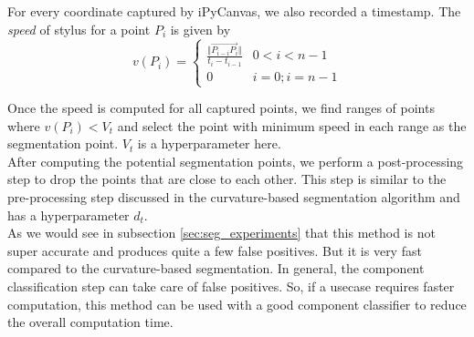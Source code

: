 For every coordinate captured by iPyCanvas, we also recorded a timestamp. The \textit{speed} of stylus for a point $P_i$ is given by
\begin{equation}
	v(P_i) = \begin{cases}
		\frac{\Vert \overrightarrow{P_{i-i} P_i}  \Vert}{t_i - t_{i - 1}} & 0 < i < n - 1\\
		0 & i = 0; i = n-1
	\end{cases}
\end{equation}

Once the speed is computed for all captured points, we find ranges of points where $v(P_i) < V_t$ and select the point with minimum speed in each range as the segmentation point. $V_t$ is a hyperparameter here.\\

After computing the potential segmentation points, we perform a post-processing step to drop the points that are close to each other. This step is similar to the pre-processing step discussed in the curvature-based segmentation algorithm and has a hyperparameter $d_t$.\\

As we would see in subsection \ref{sec:seg_experiments} that this method is not super accurate and produces quite a few false positives. But it is very fast compared to the curvature-based segmentation. In general, the component classification step can take care of false positives. So, if a usecase requires faster computation, this method can be used with a good component classifier to reduce the overall computation time.

